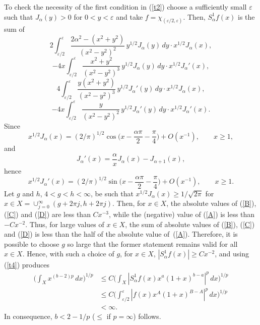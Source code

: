 \documentclass[leqno,a4paper]{amsart}
\begin{document}
To check the necessity of the first condition in (\ref{t2}) choose a
sufficiently small $\varepsilon$ such that $J_\alpha(y)>0$ for $0<y<
\varepsilon$ and take $f=\chi_{(\varepsilon/2,\varepsilon)}$. Then, $S^1_\alpha
f(x)$ is the sum of
\begin{equation}
2\int_{\varepsilon/2}^\varepsilon \frac{2\alpha^2-(x^2+y^2)}{(x^2-y^2)^2}
\,y^{1/2}J_\alpha(y)\,dy \cdot x^{1/2}J_\alpha(x),
\label{A}
\end{equation}
\begin{equation}
-4x\int_{\varepsilon/2}^\varepsilon \frac{x^2+y^2}{(x^2-y^2)^3}
\,y^{1/2}J_\alpha(y)\,dy \cdot x^{1/2}J_\alpha'(x),
\label{B}
\end{equation}
\begin{equation}
4\int_{\varepsilon/2}^\varepsilon \frac{y(x^2+y^2)}{(x^2-y^2)^3}
\,y^{1/2}J_\alpha'(y)\,dy \cdot x^{1/2}J_\alpha(x),
\label{C}
\end{equation}
\begin{equation}
-4x\int_{\varepsilon/2}^\varepsilon \frac{y}{(x^2-y^2)^2}
\,y^{1/2}J_\alpha'(y)\,dy \cdot x^{1/2}J_\alpha'(x).
\label{D}
\end{equation}
Since
$$
x^{1/2}J_\alpha(x) = (2/\pi)^{1/2} \cos\Big(x-\frac{\alpha\pi}2-
\frac\pi4\Big) + O(x^{-1}), \qquad x\ge1,
$$
and
$$
J_\alpha'(x) = \frac{\alpha}xJ_\alpha(x)-J_{\alpha+1}(x),
$$
hence
$$
x^{1/2}J_\alpha'(x) = (2/\pi)^{1/2} \sin\Big(x-\frac{\alpha\pi}2-
\frac\pi4\Big) + O(x^{-1}), \qquad x\ge1.
$$
Let $g$ and $h$, $4<g<h<\infty$, be such that $x^{1/2}J_\alpha(x)\ge
1/\sqrt{2\pi}$ for $x\in X=\cup_{j=0}^\infty(g+2\pi j,h+2\pi j)$.
Then, for $x\in X$, the absolute values of (\ref{B}), (\ref{C}) and
(\ref{D}) are less than $Cx^{-3}$, while the (negative) value of (\ref{A})
is less than $-Cx^{-2}$. Thus, for large values of $x\in X$, the sum of absolute values
of (\ref{B}), (\ref{C}) and (\ref{D}) is less than the half of the absolute
value of~(\ref{A}). Therefore, it is possible to choose $g$ so large that the former
statement remains valid for all $x\in X$. Hence, with such a choice of $g$, for
$x\in X$, $|S^1_\alpha f(x)|\ge Cx^{-2}$, and using (\ref{t4}) produces
\begin{align*}
\bigg(\int_Xx^{(b-2)p}\,dx\bigg)^{1/p}&
\le C\bigg(\int_X|S^1_\alpha f(x)x^a(1+x)^{b-a}|^p\,dx\bigg)^{1/p}\\
&\le C\bigg(\int_{\varepsilon/2}^\varepsilon|f(x)x^A(1+x)^{B-A}|^p\,dx\bigg)^{1/p}\\
&<\infty.
\end{align*}
In consequence, $b<2-1/p$ ($\le$ if $p=\infty$) follows.
\end{document}
